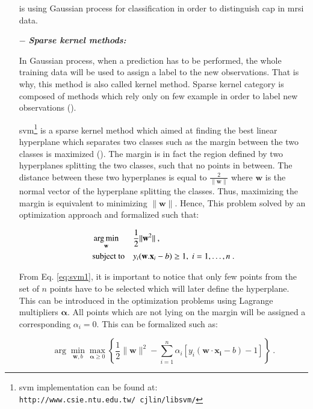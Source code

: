\begin{enumerate}[leftmargin=*]
\cite{Kelm2007} is using Gaussian process for classification in order to distinguish \ac{cap} in \ac{mrsi} data.

\item[$-$] \textbf{\textit{Sparse kernel methods:}}

In Gaussian process, when a prediction has to be performed, the whole training data will be used to assign a label to the new observations. That is why, this method is also called kernel method. Sparse kernel category is composed of methods which rely only on few example in order to label new observations (\cite{Bishop2006}).

\Acf{svm}\footnote{\ac{svm} implementation can be found at: \texttt{http://www.csie.ntu.edu.tw/\allowbreak ~cjlin/libsvm/}} is a sparse kernel method which aimed at finding the best linear hyperplane which separates two classes such as the margin between the two classes is maximized (\cite{Vapnik1963}). The margin is in fact the region defined by two hyperplanes splitting the two classes, such that no points in between. The distance between these two hyperplanes is equal to $\frac{2}{\|\mathbf{w}\|}$ where $\mathbf{w}$ is the normal vector of the hyperplane splitting the classes. Thus, maximizing the margin is equivalent to minimizing $\|\mathbf{w}\|$. Hence, This problem solved by an optimization approach and formalized such that:

\begin{equation}
\begin{aligned}
& \operatorname*{arg\,min}_{\mathbf{w}}
& & \frac{1}{2} \| \mathbf{w}^2\| \ , \\
& \text{subject to}
& & y_i(\mathbf{w}.\mathbf{x}_i - b) \geq 1, \; i = 1, \ldots, n \ .
\end{aligned}
\label{eq:svm1}
\end{equation}

From Eq. \eqref{eq:svm1}, it is important to notice that only few points from the set of $n$ points have to be selected which will later define the hyperplane. This can be introduced in the optimization problems using Lagrange multipliers $\boldsymbol{\alpha}$. All points which are not lying on the margin will be assigned a corresponding $\alpha_i = 0$. This can be formalized such as:

\begin{equation}
	\arg\min_{\mathbf{w},b } \max_{\boldsymbol{\alpha}\geq 0 } \left\{ \frac{1}{2}\|\mathbf{w}\|^2 - \sum_{i=1}^{n}{\alpha_i[y_i(\mathbf{w}\cdot \mathbf{x_i} - b)-1]} \right\} \ .
	\label{eq:svm2}
\end{equation}


\end{enumerate}
